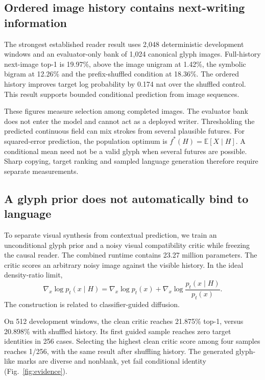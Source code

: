 \subsection*{Ordered image history contains next-writing information}
The strongest established reader result uses 2,048 deterministic development
windows and an evaluator-only bank of 1,024 canonical glyph images. Full-history
next-image top-1 is 19.97\%, above the image unigram at 1.42\%, the symbolic
bigram at 12.26\% and the prefix-shuffled condition at 18.36\%. The ordered
history improves target log probability by 0.174 nat over the shuffled control.
This result supports bounded conditional prediction from image sequences.

These figures measure selection among completed images. The evaluator bank
does not enter the model and cannot act as a deployed writer. Thresholding
the predicted continuous field can mix strokes from several plausible futures.
For squared-error prediction, the population optimum is
$f^*(H)=\mathbb{E}[X\mid H]$. A conditional mean need not be a valid glyph
when several futures are possible. Sharp copying, target ranking and sampled
language generation therefore require separate measurements.

\subsection*{A glyph prior does not automatically bind to language}
To separate visual synthesis from contextual prediction, we train an
unconditional glyph prior and a noisy visual compatibility critic while
freezing the causal reader. The combined runtime contains 23.27 million
parameters. The critic scores an arbitrary noisy image against the visible
history. In the ideal density-ratio limit,
\begin{equation}
\nabla_x\log p_t(x\mid H)=\nabla_x\log p_t(x)
+\nabla_x\log\frac{p_t(x\mid H)}{p_t(x)}.
\end{equation}
The construction is related to classifier-guided diffusion\cite{guidance}.

On 512 development windows, the clean critic reaches 21.875\% top-1, versus
20.898\% with shuffled history. Its first guided sample reaches zero target
identities in 256 cases. Selecting the highest clean critic score among four
samples reaches 1/256, with the same result after shuffling history. The
generated glyph-like marks are diverse and nonblank, yet fail conditional
identity (Fig.~\ref{fig:evidence}).

